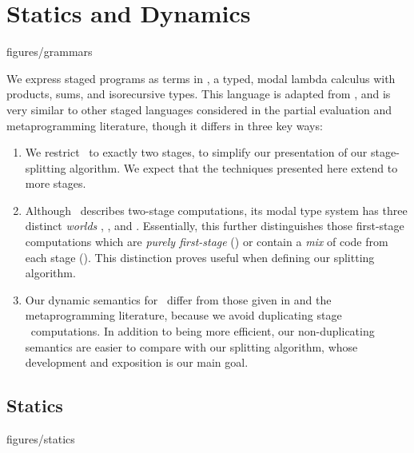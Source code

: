 
\section{\texorpdfstring{\lang}{λ12} Statics and Dynamics}
\label{sec:semantics}



 {figures/grammars}

We express staged programs as terms in \lang, a typed, modal lambda calculus
with products, sums, and isorecursive types. This language is adapted from
\cite{davies96}, and is very similar to other staged languages considered in the
partial evaluation and metaprogramming literature, though it differs in three
key ways:

\begin{enumerate}

\item We restrict \lang\ to exactly two stages, to simplify our
presentation of our stage-splitting algorithm. We expect that the techniques
presented here extend to more stages.

\item Although \lang\ describes two-stage computations, its modal type system
has three distinct \emph{worlds} \bbonem, \bbonep, and \bbtwo. Essentially, this
further distinguishes those first-stage computations which are \emph{purely
first-stage} (\bbonep) or contain a \emph{mix} of code from each stage
(\bbonem). This distinction proves useful when defining our splitting algorithm.

\item Our dynamic semantics for \lang\ differ from those given in \cite{davies96} and
the metaprogramming literature, because we avoid duplicating stage \bbtwo\
computations. In addition to being more efficient, our non-duplicating semantics
are easier to compare with our splitting algorithm, whose development and
exposition is our main goal.

\end{enumerate}


\subsection{Statics}

 {figures/statics}

